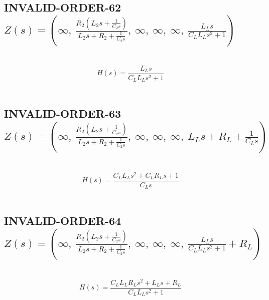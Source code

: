 \documentclass{article}
\begin{document}
\subsection{INVALID-ORDER-62 $Z(s) = \left( \infty, \  \frac{R_{2} \left(L_{2} s + \frac{1}{C_{2} s}\right)}{L_{2} s + R_{2} + \frac{1}{C_{2} s}}, \  \infty, \  \infty, \  \infty, \  \frac{L_{L} s}{C_{L} L_{L} s^{2} + 1}\right)$ } \ 
\textbf{\[H(s) = \frac{L_{L} s}{C_{L} L_{L} s^{2} + 1}\] } \ 
\subsection{INVALID-ORDER-63 $Z(s) = \left( \infty, \  \frac{R_{2} \left(L_{2} s + \frac{1}{C_{2} s}\right)}{L_{2} s + R_{2} + \frac{1}{C_{2} s}}, \  \infty, \  \infty, \  \infty, \  L_{L} s + R_{L} + \frac{1}{C_{L} s}\right)$ } \ 
\textbf{\[H(s) = \frac{C_{L} L_{L} s^{2} + C_{L} R_{L} s + 1}{C_{L} s}\] } \ 
\subsection{INVALID-ORDER-64 $Z(s) = \left( \infty, \  \frac{R_{2} \left(L_{2} s + \frac{1}{C_{2} s}\right)}{L_{2} s + R_{2} + \frac{1}{C_{2} s}}, \  \infty, \  \infty, \  \infty, \  \frac{L_{L} s}{C_{L} L_{L} s^{2} + 1} + R_{L}\right)$ } \ 
\textbf{\[H(s) = \frac{C_{L} L_{L} R_{L} s^{2} + L_{L} s + R_{L}}{C_{L} L_{L} s^{2} + 1}\] } \ 
\end{document}

